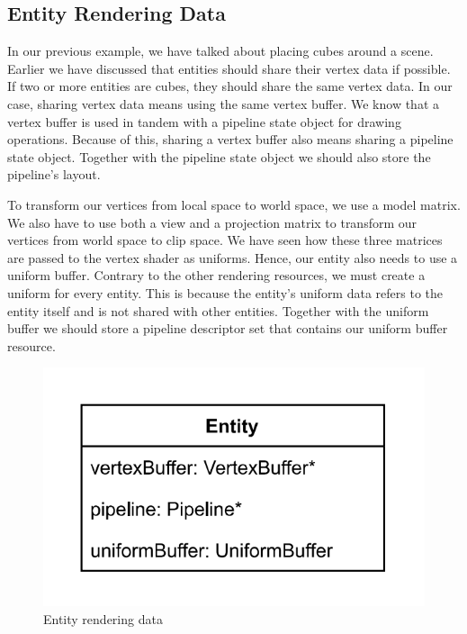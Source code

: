 \subsection{Entity Rendering Data}

In our previous example, we have talked about placing cubes around a scene.
Earlier we have discussed that entities should share their vertex data if possible.
If two or more entities are cubes, they should share the same vertex data.
In our case, sharing vertex data means using the same vertex buffer.
We know that a vertex buffer is used in tandem with a pipeline state object for
drawing operations.
Because of this, sharing a vertex buffer also means sharing a pipeline state
object.
Together with the pipeline state object we should also store the pipeline's layout.

To transform our vertices from local space to world space, we use a model matrix.
We also have to use both a view and a projection matrix to transform our vertices
from world space to clip space.
We have seen how these three matrices are passed to the vertex shader as uniforms.
Hence, our entity also needs to use a uniform buffer.
Contrary to the other rendering resources, we must create a uniform for every
entity.
This is because the entity's uniform data refers to the entity itself and is not
shared with other entities.
Together with the uniform buffer we should store a pipeline descriptor set that
contains our uniform buffer resource.

\begin{figure}[ht]
    \centering
    \includegraphics[scale=0.40]{images/ChScene/EntityRenderingData.png}
    \caption{Entity rendering data}
    \label{fig::EntityRenderingData}
\end{figure}


